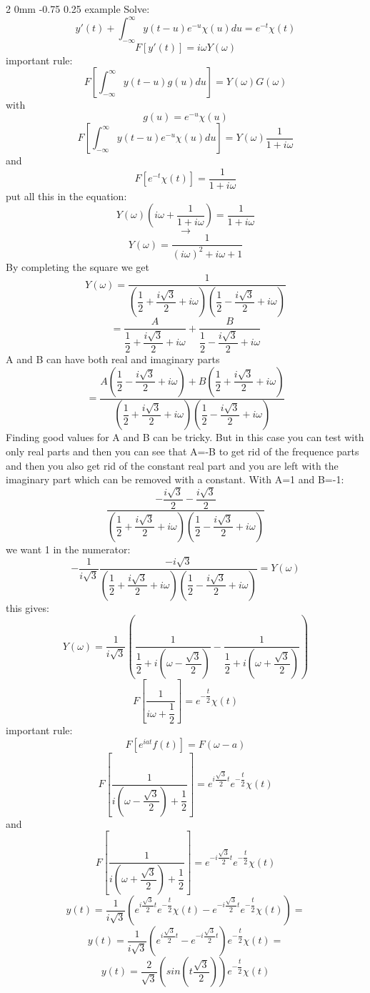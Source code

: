 \documentclass[a4paper,11pt]{article}
\makeatletter
\renewcommand{\subsection}{\@startsection
   {subsection}%
   {2}%
   {0mm}%
   {-0.75\baselineskip}%
   {0.25\baselineskip}%
   {\rmfamily\normalfont\slshape\normalsize}}%
\makeatother
\begin{document}
\subsection{example}
Solve:
$$y'(t)+\int_{-\infty}^{\infty}y(t-u)e^{-u}\chi(u)du=e^{-t}\chi(t)$$
$$F[y'(t)]=i\omega Y(\omega)$$
important rule:
$$F[\int_{-\infty}^{\infty}y(t-u)g(u)du]=Y(\omega)G(\omega)$$
with 
$$g(u)=e^{-u}\chi(u)$$
$$F[\int_{-\infty}^{\infty}y(t-u)e^{-u}\chi(u)du]=Y(\omega)\dfrac{1}{1+i\omega}$$
and
$$F[e^{-t}\chi(t)]=\dfrac{1}{1+i\omega}$$
put all this in the equation:
$$Y(\omega)(i\omega+\dfrac{1}{1+i\omega})=\dfrac{1}{1+i\omega}$$
$$\rightarrow$$
$$Y(\omega)=\dfrac{1}{(i\omega)^2+i\omega+1}$$
By completing the square we get
$$Y(\omega)=\dfrac{1}{(\dfrac{1}{2}+\dfrac{i\sqrt{3}}{2}+i\omega)(\dfrac{1}{2}-\dfrac{i\sqrt{3}}{2}+i\omega)}$$
$$=\dfrac{A}{\dfrac{1}{2}+\dfrac{i\sqrt{3}}{2}+i\omega}+\dfrac{B}{\dfrac{1}{2}-\dfrac{i\sqrt{3}}{2}+i\omega}$$
A and B can have both real and imaginary parts
$$=\dfrac{A(\dfrac{1}{2}-\dfrac{i\sqrt{3}}{2}+i\omega)+B(\dfrac{1}{2}+\dfrac{i\sqrt{3}}{2}+i\omega)}{(\dfrac{1}{2}+\dfrac{i\sqrt{3}}{2}+i\omega)(\dfrac{1}{2}-\dfrac{i\sqrt{3}}{2}+i\omega)}$$
Finding good values for A and B can be tricky. But in this case you can test with only real parts and then you can see that 
A=-B to get rid of the frequence parts and then you also get rid of the constant real part and you are left with the imaginary part which can be removed with a constant.
With A=1 and B=-1:
$$\dfrac{-\dfrac{i\sqrt{3}}{2}-\dfrac{i\sqrt{3}}{2}}{(\dfrac{1}{2}+\dfrac{i\sqrt{3}}{2}+i\omega)(\dfrac{1}{2}-\dfrac{i\sqrt{3}}{2}+i\omega)}$$
we want 1 in the numerator:
$$-\dfrac{1}{i\sqrt{3}}\dfrac{-i\sqrt{3}}{(\dfrac{1}{2}+\dfrac{i\sqrt{3}}{2}+i\omega)(\dfrac{1}{2}-\dfrac{i\sqrt{3}}{2}+i\omega)}=Y(\omega)$$
this gives:
$$Y(\omega)=\dfrac{1}{i\sqrt{3}}(\dfrac{1}{\dfrac{1}{2}+i(\omega-\dfrac{\sqrt{3}}{2})}-\dfrac{1}{\dfrac{1}{2}+i(\omega+\dfrac{\sqrt{3}}{2})})$$
$$F[\dfrac{1}{i\omega+\dfrac{1}{2}}]=e^{-\dfrac{t}{2}}\chi(t)$$
important rule:
$$F[e^{iat}f(t)]=F(\omega -a)$$
$$F[\dfrac{1}{i(\omega-\dfrac{\sqrt{3}}{2})+\dfrac{1}{2}}]=e^{i\dfrac{\sqrt{3}}{2}t}e^{-\dfrac{t}{2}}\chi(t)$$
and
$$F[\dfrac{1}{i(\omega+\dfrac{\sqrt{3}}{2})+\dfrac{1}{2}}]=e^{-i\dfrac{\sqrt{3}}{2}t}e^{-\dfrac{t}{2}}\chi(t)$$
$$y(t)=\dfrac{1}{i\sqrt{3}}(e^{i\dfrac{\sqrt{3}}{2}t}e^{-\dfrac{t}{2}}\chi(t)-e^{-i\dfrac{\sqrt{3}}{2}t}e^{-\dfrac{t}{2}}\chi(t))=$$
$$y(t)=\dfrac{1}{i\sqrt{3}}(e^{i\dfrac{\sqrt{3}}{2}t}-e^{-i\dfrac{\sqrt{3}}{2}t})e^{-\dfrac{t}{2}}\chi(t)=$$
$$y(t)=\dfrac{2}{\sqrt{3}}(sin(t\dfrac{\sqrt{3}}{2}))e^{-\dfrac{t}{2}}\chi(t)$$
\end{document}
